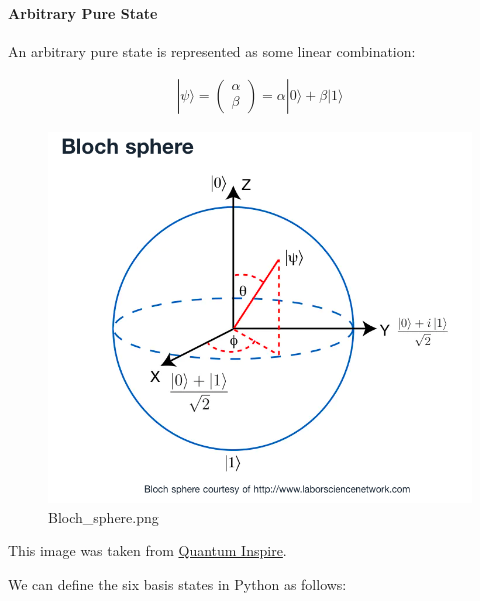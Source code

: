 \documentclass[11pt]{article}
\makeatletter
\def\maxwidth{\ifdim\Gin@nat@width>\linewidth\linewidth
    \else\Gin@nat@width\fi}
\let\Oldincludegraphics\includegraphics
\renewcommand{\includegraphics}[1]{\Oldincludegraphics[width=.8\maxwidth]{#1}}
\makeatother
\begin{document}
    \hypertarget{arbitrary-pure-state}{%
\paragraph{Arbitrary Pure State}\label{arbitrary-pure-state}}

An arbitrary pure state is represented as some linear combination:

\begin{align}
|\psi \rangle =
\begin{pmatrix}
\alpha \\ \beta
\end{pmatrix} = \alpha |0\rangle + \beta |1\rangle
\end{align}

    \begin{figure}
\centering
\includegraphics{Bloch_sphere.png}
\caption{Bloch\_sphere.png}
\end{figure}

    This image was taken from
\href{https://www.quantum-inspire.com/kbase/bloch-sphere/}{Quantum
Inspire}.

    We can define the six basis states in Python as follows:
\end{document}
